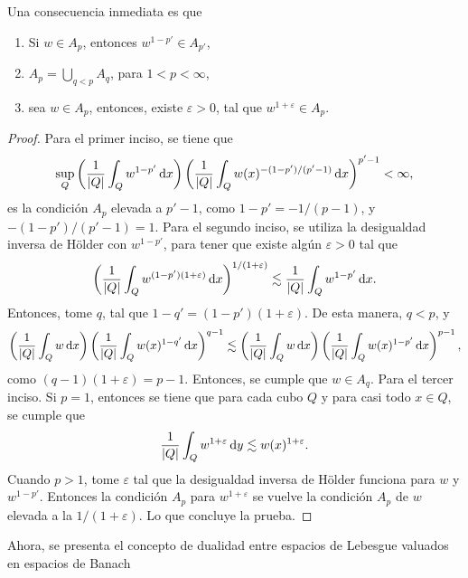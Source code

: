 Una consecuencia inmediata es que 
\begin{corollary}\label{cor:inverse-Holder}
	\begin{enumerate}
		\item Si $w\in A_p$, entonces $w^{1-p'}\in A_{p'}$,
		\item $A_p = \bigcup_{q<p}A_q$, para $1<p<\infty$,
		\item sea $w\in A_p$, entonces, existe $\varepsilon>0$, tal que $w^{1+\varepsilon}\in A_p$.
	\end{enumerate}
\end{corollary}
\begin{proof}
	Para el primer inciso, se tiene que 
	\begin{equation*}
		\sup_Q\left(\frac{1}{|Q|}\int_Q w^{1-p'}\mathop{}\!\mathrm{d} x \right)\left(\frac{1}{|Q|}\int_Q w(x)^{-(1-p')/(p'-1)}\mathop{}\!\mathrm{d} x\right)^{p'-1} < \infty,
	\end{equation*}
	es la condición $A_p$ elevada a $p'-1$, como $1-p' = -1/(p-1)$, y $-(1-p')/(p'-1) = 1$. Para el segundo inciso, se utiliza la desigualdad inversa de Hölder con $w^{1-p'}$, para tener que existe algún $\varepsilon>0$ tal que
	\begin{equation*}
		\left(\frac{1}{|Q|}\int_Q w^{(1-p')(1+\varepsilon)}\mathop{}\!\mathrm{d} x\right)^{1/(1+\varepsilon)} \lesssim \frac{1}{|Q|}\int_Q w^{1-p'}\mathop{}\!\mathrm{d} x.
	\end{equation*}
	Entonces, tome $q$, tal que $1-q' = (1-p')(1+\varepsilon)$. De esta manera, $q<p$, y
	\begin{equation*}
		\left(\frac{1}{|Q|}\int_Q w \mathop{}\!\mathrm{d} x \right)\left(\frac{1}{|Q|}\int_Q w(x)^{1-q'}\mathop{}\!\mathrm{d} x\right)^{q-1}  \lesssim \left(\frac{1}{|Q|}\int_Q w \mathop{}\!\mathrm{d} x \right)\left(\frac{1}{|Q|}\int_Q w(x)^{1-p'}\mathop{}\!\mathrm{d} x\right)^{p-1},
	\end{equation*}
	como $(q-1)(1+\varepsilon) = p-1$. Entonces, se cumple que $w\in A_q$. Para el tercer inciso. Si $p=1$, entonces se tiene que para cada cubo $Q$ y para casi todo $x\in Q$, se cumple que 
	\begin{equation*}
		\frac{1}{|Q|}\int_Q w^{1+\varepsilon}\mathop{}\!\mathrm{d} y \lesssim w(x)^{1+\varepsilon}.
	\end{equation*}
	Cuando $p>1$, tome $\varepsilon$ tal que la desigualdad inversa de Hölder funciona para $w$ y  $w^{1-p'}$.  Entonces la condición $A_p$ para $w^{1+\varepsilon}$ se vuelve la condición $A_p$ de $w$ elevada a la $1/(1+\varepsilon)$. Lo que concluye la prueba. 
\end{proof}
Ahora, se presenta el concepto de dualidad entre espacios de Lebesgue valuados en espacios de Banach
